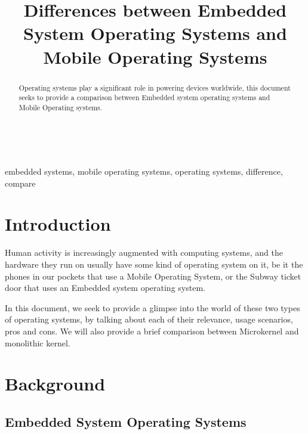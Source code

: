 \documentclass[conference]{IEEEtran}
\newcommand{\forceindent}{\leavevmode{\parindent=1em\indent}}
\begin{document}
\title{Differences between Embedded System Operating Systems and Mobile Operating Systems\\
}



\maketitle

\forceindent \begin{abstract}
Operating systems play a significant role in powering devices worldwide, this document seeks to provide a comparison between Embedded system operating systems and Mobile Operating systems.
\end{abstract}
\mbox{} \\
\forceindent \begin{IEEEkeywords}
embedded systems, mobile operating systems, operating systems, difference, compare
\end{IEEEkeywords}

\section{Introduction}
\forceindent Human activity is increasingly augmented with computing systems, and the hardware they run on usually have some kind of operating system on it, be it the phones in our pockets that use a Mobile Operating System, or the Subway ticket door that uses an Embedded system operating system.

\smallskip
\forceindent In this document, we seek to provide a glimpse into the world of these two types of operating systems, by talking about each of their relevance, usage scenarios, pros and cons. We will also provide a brief comparison between Microkernel and monolithic kernel.

\section{Background}
\subsection{Embedded System Operating Systems}
\end{document}
